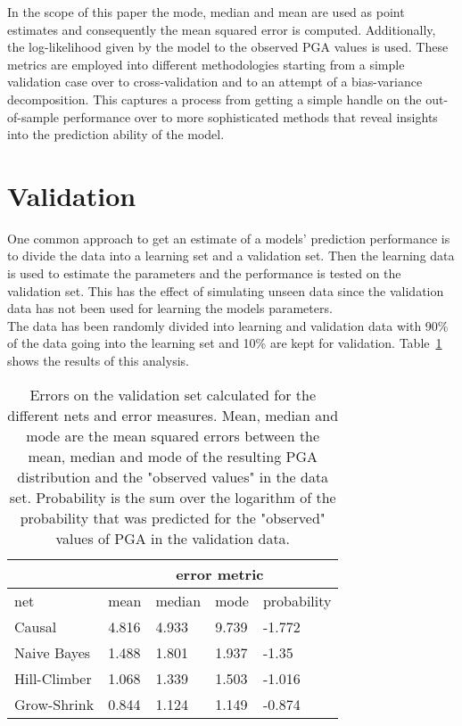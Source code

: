 In the scope of this paper the mode, median and mean are used as point estimates and consequently the mean squared error is computed. Additionally, the log-likelihood given by the model to the observed PGA values is used. These metrics are employed into different methodologies starting from a simple validation case over to cross-validation and to an attempt of a bias-variance decomposition. This captures a process from getting a simple handle on the out-of-sample performance over to more sophisticated methods that reveal insights into the prediction ability of the model.


\section{Validation}
One common approach to get an estimate of a models' prediction performance is to divide the data into a learning set and a validation set. Then the learning data is used to estimate the parameters and the performance is tested on the validation set. This has the effect of simulating unseen data since the validation data has not been used for learning the models parameters.\\
The data has been randomly divided into learning and validation data with 90\% of the data going into the learning set and 10\% are kept for validation. Table~\ref{tab:validation} shows the results of this analysis. 

\begin{table}[h]
\caption[Validation Error]{Errors on the validation set calculated for the different nets and error measures. Mean, median and mode are the mean squared errors between the mean, median and mode of the resulting PGA distribution and the "observed values" in the data set. Probability is the sum over the logarithm of the probability that was predicted for the "observed" values of PGA in the validation data.}
\centering
\begin{tabular}{ l l l l l  }
 \hline
  & \multicolumn{4}{c}{error metric} \\
 \hline
 net & mean & median & mode & probability\\
 \hline
 Causal   & 4.816    & 4.933  & 9.739   &-1.772\\
 Naive Bayes   & 1.488      & 1.801 & 1.937  &-1.35\\
 Hill-Climber   & 1.068      & 1.339 & 1.503  &-1.016\\
 Grow-Shrink   & 0.844     & 1.124  & 1.149 &-0.874\\
\end{tabular}
\label{tab:validation}
\end{table}

